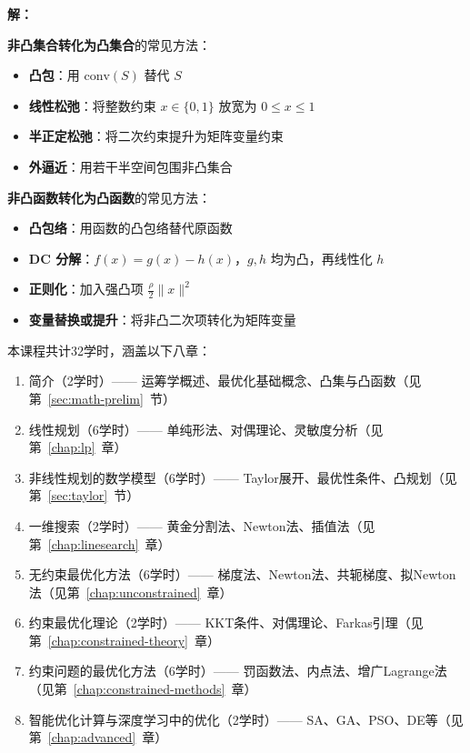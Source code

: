 \begin{example}[非凸集合与非凸函数的凸化]\label{ex:convexification}
\textbf{解：}

\textbf{非凸集合转化为凸集合}的常见方法：
\begin{itemize}[itemsep=0.2em]
    \item \textbf{凸包}：用 $\text{conv}(S)$ 替代 $S$
    \item \textbf{线性松弛}：将整数约束 $x \in \{0, 1\}$ 放宽为 $0 \leq x \leq 1$
    \item \textbf{半正定松弛}：将二次约束提升为矩阵变量约束
    \item \textbf{外逼近}：用若干半空间包围非凸集合
\end{itemize}

\textbf{非凸函数转化为凸函数}的常见方法：
\begin{itemize}[itemsep=0.2em]
    \item \textbf{凸包络}：用函数的凸包络替代原函数
    \item \textbf{DC 分解}：$f(x) = g(x) - h(x)$，$g, h$ 均为凸，再线性化 $h$
    \item \textbf{正则化}：加入强凸项 $\frac{\rho}{2}\|x\|^2$
    \item \textbf{变量替换或提升}：将非凸二次项转化为矩阵变量
\end{itemize}
\end{example}

\begin{notebox}[课程涵盖内容]
本课程共计32学时，涵盖以下八章：
\begin{enumerate}[label=第\arabic*章, leftmargin=3em]
    \item 简介（2学时）—— 运筹学概述、最优化基础概念、凸集与凸函数（见第~\ref{sec:math-prelim}~节）
    \item 线性规划（6学时）—— 单纯形法、对偶理论、灵敏度分析（见第~\ref{chap:lp}~章）
    \item 非线性规划的数学模型（6学时）—— Taylor展开、最优性条件、凸规划（见第~\ref{sec:taylor}~节）
    \item 一维搜索（2学时）—— 黄金分割法、Newton法、插值法（见第~\ref{chap:linesearch}~章）
    \item 无约束最优化方法（6学时）—— 梯度法、Newton法、共轭梯度、拟Newton法（见第~\ref{chap:unconstrained}~章）
    \item 约束最优化理论（2学时）—— KKT条件、对偶理论、Farkas引理（见第~\ref{chap:constrained-theory}~章）
    \item 约束问题的最优化方法（6学时）—— 罚函数法、内点法、增广Lagrange法（见第~\ref{chap:constrained-methods}~章）
    \item 智能优化计算与深度学习中的优化（2学时）—— SA、GA、PSO、DE等（见第~\ref{chap:advanced}~章）
\end{enumerate}
\end{notebox}


